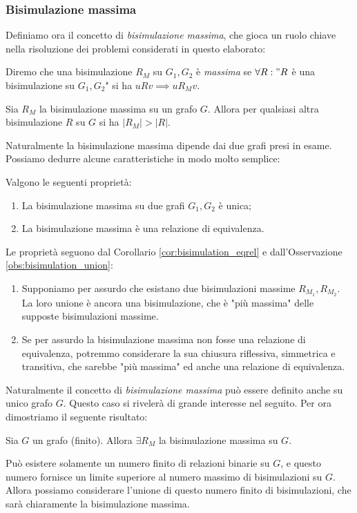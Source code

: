 \subsubsection{Bisimulazione massima}
\label{sec:bisi_max}
Definiamo ora il concetto di \emph{bisimulazione massima}, che gioca un ruolo chiave nella risoluzione dei problemi considerati in questo elaborato:
\begin{definition}
    Diremo che una bisimulazione $R_M$ su $G_1, G_2$ è \emph{massima} se $\forall R : "R$ è una bisimulazione su $G_1, G_2$" si ha $u R v \implies u R_M v$.
\end{definition}
\begin{observation}
    Sia $R_M$ la bisimulazione massima su un grafo $G$. Allora per qualsiasi altra bisimulazione $R$ su $G$ si ha $|R_M| > |R|$.
\end{observation}
Naturalmente la bisimulazione massima dipende dai due grafi presi in esame. Possiamo dedurre alcune caratteristiche in modo molto semplice:
\begin{proposition}
    Valgono le seguenti proprietà:
    \begin{enumerate}
        \item La bisimulazione massima su due grafi $G_1,G_2$ è unica;
        \item La bisimulazione massima è una relazione di equivalenza.
    \end{enumerate}
    \label{prop:bisi_max_equi}
\end{proposition}
\begin{proof2}
    Le proprietà seguono dal Corollario \ref{cor:bisimulation_eqrel} e dall'Osservazione \ref{obs:bisimulation_union}:
    \begin{enumerate}
        \item Supponiamo per assurdo che esistano due bisimulazioni massime $R_{M_1}, R_{M_2}$. La loro unione è ancora una bisimulazione, che è "più massima" delle supposte bisimulazioni massime.
        \item Se per assurdo la bisimulazione massima non fosse una relazione di equivalenza, potremmo considerare la sua chiusura riflessiva, simmetrica e transitiva, che sarebbe "più massima" ed anche una relazione di equivalenza.
    \end{enumerate}
\end{proof2}
Naturalmente il concetto di \emph{bisimulazione massima} può essere definito anche su unico grafo $G$. Questo caso si rivelerà di grande interesse nel seguito. Per
ora dimostriamo il seguente risultato:
\begin{theorem}
    Sia $G$ un grafo (finito). Allora $\exists R_M$ la bisimulazione massima su $G$.
\end{theorem}
\begin{proof2}
    Può esistere solamente un numero finito di relazioni binarie su $G$, e questo numero fornisce un limite superiore al numero massimo di bisimulazioni su $G$.
    Allora possiamo considerare l'unione di questo numero finito di bisimulazioni, che sarà chiaramente la bisimulazione massima.
\end{proof2}

